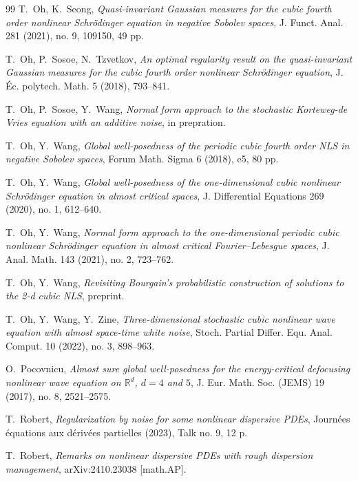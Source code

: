 \documentclass[letterpaper, 11pt,  reqno]{amsart}
\newcommand{\1}{\hspace{0.5mm}\text{I}\hspace{0.5mm}}
\newcommand{\R}{\mathbb{R}}
\numberwithin{equation}{section}
\numberwithin{theorem}{section}
\begin{document}
\begin{thebibliography}{99}
T.~Oh, K.~Seong,
{\it  Quasi-invariant Gaussian measures for the cubic fourth order nonlinear Schr\"odinger equation in negative Sobolev spaces}, J. Funct. Anal. 281 (2021), no. 9, 109150, 49 pp. 


T.~Oh, P.~Sosoe, N.~Tzvetkov,
{\it  An optimal regularity result on the quasi-invariant Gaussian measures for the cubic fourth order nonlinear Schr\"odinger equation},  
J. \'Ec. polytech. Math. 5 (2018), 793--841. 

T.~Oh, P.~Sosoe, Y.~Wang, 
{\it Normal form approach to the stochastic Korteweg-de Vries
equation with an additive noise}, 
in prepration.




T.~Oh, Y.~Wang,
{\it Global well-posedness of the periodic cubic fourth order NLS in negative Sobolev spaces},
 Forum Math. Sigma 6 (2018), e5, 80 pp. 



T.~Oh, Y.~Wang,
{\it Global well-posedness of the one-dimensional cubic nonlinear Schr\"odinger equation in almost critical spaces}, J. Differential Equations 269 (2020), no. 1, 612--640. 


T.~Oh, Y.~Wang,
{\it  Normal form approach to the one-dimensional periodic cubic nonlinear Schr\"odinger equation in almost critical Fourier--Lebesgue spaces}, 
J. Anal. Math. 143 (2021), no. 2, 723--762. 

T.~Oh, Y.~Wang,
{\it Revisiting Bourgain's probabilistic construction of solutions to the 2-d cubic NLS}, 
preprint.


T.~Oh, Y.~Wang, Y.~Zine,
\textit{Three-dimensional stochastic cubic nonlinear wave equation with almost space-time white noise},
Stoch. Partial Differ. Equ. Anal. Comput. 10 (2022), no. 3, 898--963.


O.~Pocovnicu, 
{\it Almost sure global well-posedness for the energy-critical defocusing nonlinear wave equation on $\R^d$,
 $d = 4$ and $5$}, J. Eur. Math. Soc. (JEMS) 19 (2017), no. 8, 2521--2575.






T.~Robert, 
{\it Regularization by noise for some nonlinear dispersive PDEs},
 Journ\'ees \'equations aux d\'eriv\'ees partielles (2023), Talk no. 9, 12 p. 





T.~Robert, 
{\it Remarks on nonlinear dispersive PDEs with rough dispersion management}, 
arXiv:2410.23038 [math.AP].





\end{thebibliography}
\end{document}

